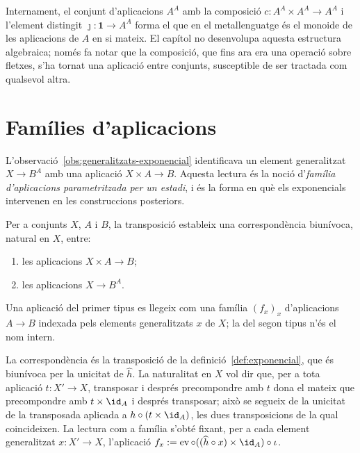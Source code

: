 \begin{observacio}\label{obs:composicio-interna-classica}
Internament, el conjunt d'aplicacions \(A^{A}\) amb la composició
\(c\colon A^{A}\times A^{A}\to A^{A}\) i l'element distingit
\(\jmath\colon\mathbf1\to A^{A}\) forma el que en el metallenguatge és el
monoide de les aplicacions de \(A\) en si mateix. El capítol no
desenvolupa aquesta estructura algebraica; només fa notar que la
composició, que fins ara era una operació sobre fletxes, s'ha tornat una
aplicació entre conjunts, susceptible de ser tractada com qualsevol
altra.
\end{observacio}

\section{Famílies d'aplicacions}\label{sec:families}

L'observació~\ref{obs:generalitzats-exponencial} identificava un element
generalitzat \(X\to B^A\) amb una aplicació \(X\times A\to B\). Aquesta
lectura és la noció d'\emph{família d'aplicacions parametritzada per un
estadi}, i és la forma en què els exponencials intervenen en les
construccions posteriors.

\begin{proposicio}\label{prop:families}
Per a conjunts \(X\), \(A\) i \(B\), la transposició estableix una
correspondència biunívoca, natural en \(X\), entre:
\begin{enumerate}
\item les aplicacions \(X\times A\to B\);
\item les aplicacions \(X\to B^A\).
\end{enumerate}
Una aplicació del primer tipus es llegeix com una família
\((f_x)_{x}\) d'aplicacions \(A\to B\) indexada pels elements generalitzats
\(x\) de \(X\); la del segon tipus n'és el nom intern.
\end{proposicio}

\begin{prova}
La correspondència és la transposició de la definició~\ref{def:exponencial},
que és biunívoca per la unicitat de \(\widehat h\). La naturalitat en
\(X\) vol dir que, per a tota aplicació \(t\colon X'\to X\),
transposar i després precompondre amb \(t\) dona el mateix que
precompondre amb \(t\times\id_A\) i després transposar; això se segueix de
la unicitat de la transposada aplicada a
\(h\circ(t\times\id_A)\), les dues transposicions de la qual coincideixen.
La lectura com a família s'obté fixant, per a cada element generalitzat
\(x\colon X'\to X\), l'aplicació \(f_x:=\operatorname{ev}\circ((\widehat
h\circ x)\times\id_A)\circ\iota\).
\end{prova}

